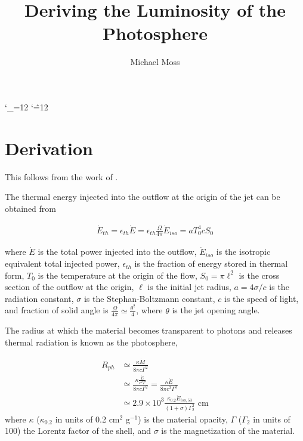 \documentclass[linenumbers,twocolumn]{aastex631}
\def\upsubscripts{\catcode`\_=12 } \def\normalsubscripts{\catcode`\_=8 }
\def\upsupscripts{\catcode`\^=12 } \def\normalsupscripts{\catcode`\^=7 }
\begin{document}
\upsubscripts
\upsupscripts

\title{Deriving the Luminosity of the Photosphere}

\author{Michael Moss}



\section{Derivation}

This follows from the work of \citet{2013A&A...551A.124H}.

The thermal energy injected into the outflow at the origin of the jet can be obtained from 

\begin{align}
	\dot{E}_{th} = \epsilon_{th} \dot{E} = \epsilon_{th} \frac{\Omega}{4\pi}\dot{E}_{iso} = aT_0^4 c S_0 \label{eq: t0}
\end{align}

where $\dot{E}$ is the total power injected into the outflow, $\dot{E}_{iso}$ is the isotropic equivalent total injected power, $\epsilon_{th}$ is the fraction of energy stored in thermal form, $T_0$ is the temperature at the origin of the flow, $S_0=\pi \ell^2$ is the cross section of the outflow at the origin, $\ell$ is the initial jet radius, $a=4\sigma/c$ is the radiation constant, $\sigma$ is the Stephan-Boltzmann constant, $c$ is the speed of light, and fraction of solid angle is $\frac{\Omega}{4\pi}\simeq \frac{\theta^2}{4}$, where $\theta$ is the jet opening angle. 

The radius at which the material becomes transparent to photons and releases thermal radiation is known as the photosphere, 

\begin{align}
	R_{ph} &\simeq \frac{\kappa \dot{M}}{8\pi c \Gamma^2} \nonumber\\
	&\simeq \frac{\kappa \frac{\dot{E}}{c^2\Gamma}}{8\pi c \Gamma^2} = \frac{\kappa \dot{E}}{8\pi c^3 \Gamma^3} \nonumber\\
	&\simeq 2.9\times10^3\frac{\kappa_{0.2}\dot{E}_{iso,53}}{(1+\sigma)\Gamma_2^3} \text{ cm} \label{eq: phot rad}
\end{align}
where $\kappa$ ($\kappa_{0.2}$ in units of 0.2 cm$^2$ g$^{-1}$) is the material opacity, $\Gamma$ ($\Gamma_2$ in units of 100) the Lorentz factor of the shell, and $\sigma$ is the magnetization of the material. 
\end{document}
